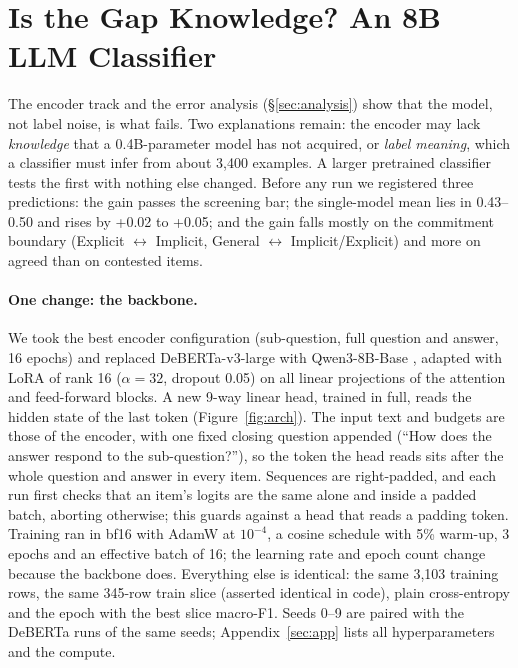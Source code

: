 \section{Is the Gap Knowledge? An 8B LLM Classifier}\label{sec:llm}

The encoder track and the error analysis (\S\ref{sec:analysis}) show that the model, not label noise, is what fails.
Two explanations remain: the encoder may lack \emph{knowledge} that a 0.4B-parameter model has not acquired, or \emph{label meaning}, which a classifier must infer from about 3,400 examples.
A larger pretrained classifier tests the first with nothing else changed.
Before any run we registered three predictions: the gain passes the screening bar; the single-model \Stwo{} mean lies in 0.43--0.50 and \Sone{} rises by +0.02 to +0.05; and the gain falls mostly on the commitment boundary (Explicit $\leftrightarrow$ Implicit, General $\leftrightarrow$ Implicit/Explicit) and more on agreed than on contested items.

\paragraph{One change: the backbone.}
We took the best encoder configuration (sub-question, full question and answer, 16 epochs) and replaced DeBERTa-v3-large with Qwen3-8B-Base \citep{qwen3}, adapted with LoRA \citep{hu2022lora} of rank 16 ($\alpha=32$, dropout 0.05) on all linear projections of the attention and feed-forward blocks.
A new 9-way linear head, trained in full, reads the hidden state of the last token (Figure~\ref{fig:arch}).
The input text and budgets are those of the encoder, with one fixed closing question appended (``How does the answer respond to the sub-question?''), so the token the head reads sits after the whole question and answer in every item.
Sequences are right-padded, and each run first checks that an item's logits are the same alone and inside a padded batch, aborting otherwise; this guards against a head that reads a padding token.
Training ran in bf16 with AdamW at $10^{-4}$, a cosine schedule with 5\% warm-up, 3 epochs and an effective batch of 16; the learning rate and epoch count change because the backbone does.
Everything else is identical: the same 3,103 training rows, the same 345-row train slice (asserted identical in code), plain cross-entropy and the epoch with the best slice macro-F1.
Seeds 0--9 are paired with the DeBERTa runs of the same seeds; Appendix~\ref{sec:app} lists all hyperparameters and the compute.

